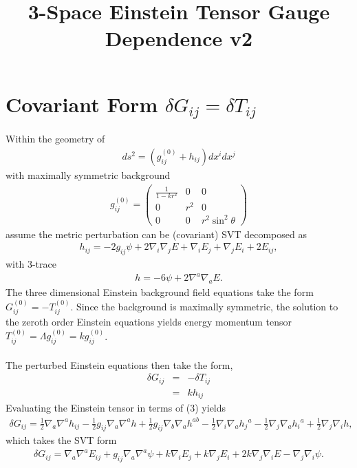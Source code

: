 \documentclass[10pt,letterpaper]{article}
\title{3-Space Einstein Tensor Gauge Dependence v2}
\date{}
\numberwithin{equation}{section}
\begin{document}
 
\maketitle
\noindent 
\section{Covariant Form $\delta G_{ij} = \delta T_{ij}$} 
\label{S1}
Within the geometry of 
\begin{eqnarray}
ds^2 = (g_{ij}^{(0)} + h_{ij})dx^i dx^j 
\end{eqnarray}
with maximally symmetric background
\begin{eqnarray}
g_{ij}^{(0)} = \begin{pmatrix} \frac{1}{1-kr^2} &0&0\\ 0&r^2&0\\0&0&r^2\sin^2\theta\end{pmatrix}
\end{eqnarray}
assume the metric perturbation can be (covariant) SVT decomposed as
\begin{eqnarray}
h_{ij} = -2 g_{ij}\psi + 2\nabla_i\nabla_j E + \nabla_i E_j + \nabla_j E_i + 2E_{ij},
\end{eqnarray}
with 3-trace
\begin{eqnarray}
h = -6 \psi + 2\nabla^a\nabla_a E.
\end{eqnarray}
The three dimensional Einstein background field equations take the form $G_{ij}^{(0)} = -T_{ij}^{(0)}$. Since the background is maximally symmetric, the solution to the zeroth order Einstein equations yields energy momentum tensor $T_{ij}^{(0)} = \Lambda g_{ij}^{(0)} = k g_{ij}^{(0)}$.
\\ \\
The perturbed Einstein equations then take the form,
\begin{eqnarray}
\delta G_{ij} &=& -\delta T_{ij}\\
&=& k h_{ij} 
\end{eqnarray}
Evaluating the Einstein tensor in terms of (3) yields
\begin{eqnarray}
\delta G_{ij}=\tfrac{1}{2} \nabla_{a}\nabla^{a}h_{ij}
 -  \tfrac{1}{2} g_{ij} \nabla_{a}\nabla^{a}h
 + \tfrac{1}{2} g_{ij} \nabla_{b}\nabla_{a}h^{ab}
 -  \tfrac{1}{2} \nabla_{i}\nabla_{a}h_{j}{}^{a}
 -  \tfrac{1}{2} \nabla_{j}\nabla_{a}h_{i}{}^{a}
 + \tfrac{1}{2} \nabla_{j}\nabla_{i}h,
\end{eqnarray}
which takes the SVT form
\begin{eqnarray}
\delta G_{ij}=\nabla_{a}\nabla^{a}E_{ij}
 + g_{ij} \nabla_{a}\nabla^{a}\psi
 + k \nabla_{i}E_{j}
 + k \nabla_{j}E_{i}
 + 2 k \nabla_{j}\nabla_{i}E
 -  \nabla_{j}\nabla_{i}\psi.
\label{dGsvt}
\end{eqnarray}
\end{document}
